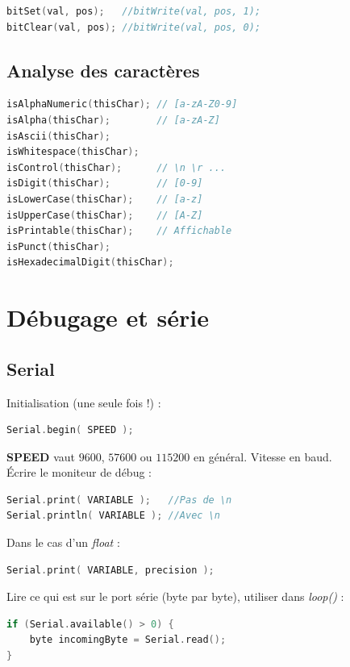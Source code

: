             \begin{lstlisting}[language=C]
bitSet(val, pos);   //bitWrite(val, pos, 1);
bitClear(val, pos); //bitWrite(val, pos, 0);
            \end{lstlisting}


        \subsection{Analyse des caractères}
            \begin{lstlisting}[language=C]
isAlphaNumeric(thisChar); // [a-zA-Z0-9]
isAlpha(thisChar);        // [a-zA-Z]
isAscii(thisChar);
isWhitespace(thisChar);
isControl(thisChar);      // \n \r ...
isDigit(thisChar);        // [0-9]
isLowerCase(thisChar);    // [a-z]
isUpperCase(thisChar);    // [A-Z]
isPrintable(thisChar);    // Affichable
isPunct(thisChar);
isHexadecimalDigit(thisChar);
            \end{lstlisting}

    \section{Débugage et série}
        \subsection{Serial}
            Initialisation (une seule fois !) :
            \begin{lstlisting}[language=C]
Serial.begin( SPEED );
            \end{lstlisting}
            \textbf{SPEED} vaut $9600$, $57600$ ou $115200$ en général. Vitesse en baud.\\
            Écrire le moniteur de débug :
            \begin{lstlisting}[language=C]
Serial.print( VARIABLE );   //Pas de \n
Serial.println( VARIABLE ); //Avec \n
            \end{lstlisting}

            Dans le cas d'un \textit{float} :
            \begin{lstlisting}[language=C]
Serial.print( VARIABLE, precision );
            \end{lstlisting}

            Lire ce qui est sur le port série (byte par byte), utiliser dans \textit{loop()} :
            \begin{lstlisting}[language=C]
if (Serial.available() > 0) {
    byte incomingByte = Serial.read();
}
            \end{lstlisting}
